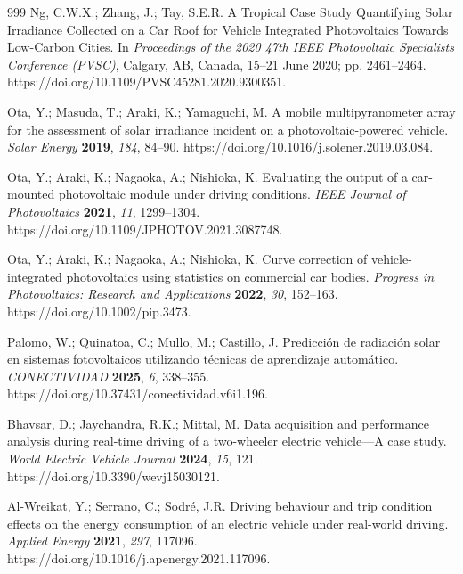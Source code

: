 \documentclass[vehicles,article,submit,moreauthors]{Definitions/mdpi}
\begin{document}
\begin{thebibliography}{999}
    Ng, C.W.X.; Zhang, J.; Tay, S.E.R. A Tropical Case Study Quantifying Solar Irradiance Collected on a Car Roof for Vehicle Integrated Photovoltaics Towards Low-Carbon Cities. In \textit{Proceedings of the 2020 47th IEEE Photovoltaic Specialists Conference (PVSC)}, Calgary, AB, Canada, 15--21 June 2020; pp. 2461--2464. https://doi.org/10.1109/PVSC45281.2020.9300351.

    Ota, Y.; Masuda, T.; Araki, K.; Yamaguchi, M. A mobile multipyranometer array for the assessment of solar irradiance incident on a photovoltaic-powered vehicle. \textit{Solar Energy} \textbf{2019}, \textit{184}, 84--90. https://doi.org/10.1016/j.solener.2019.03.084.

    Ota, Y.; Araki, K.; Nagaoka, A.; Nishioka, K. Evaluating the output of a car-mounted photovoltaic module under driving conditions. \textit{IEEE Journal of Photovoltaics} \textbf{2021}, \textit{11}, 1299--1304. https://doi.org/10.1109/JPHOTOV.2021.3087748.

    Ota, Y.; Araki, K.; Nagaoka, A.; Nishioka, K. Curve correction of vehicle-integrated photovoltaics using statistics on commercial car bodies. \textit{Progress in Photovoltaics: Research and Applications} \textbf{2022}, \textit{30}, 152--163. https://doi.org/10.1002/pip.3473.

    Palomo, W.; Quinatoa, C.; Mullo, M.; Castillo, J. Predicción de radiación solar en sistemas fotovoltaicos utilizando técnicas de aprendizaje automático. \textit{CONECTIVIDAD} \textbf{2025}, \textit{6}, 338--355. https://doi.org/10.37431/conectividad.v6i1.196.

    Bhavsar, D.; Jaychandra, R.K.; Mittal, M. Data acquisition and performance analysis during real-time driving of a two-wheeler electric vehicle---A case study. \textit{World Electric Vehicle Journal} \textbf{2024}, \textit{15}, 121. https://doi.org/10.3390/wevj15030121.

    Al-Wreikat, Y.; Serrano, C.; Sodré, J.R. Driving behaviour and trip condition effects on the energy consumption of an electric vehicle under real-world driving. \textit{Applied Energy} \textbf{2021}, \textit{297}, 117096. https://doi.org/10.1016/j.apenergy.2021.117096.


\end{thebibliography}
\end{document}
